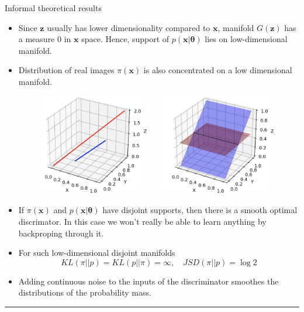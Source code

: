 \documentclass{beamer}
\newcommand{\bx}{\mathbf{x}}
\newcommand{\bz}{\mathbf{z}}
\newcommand{\btheta}{\boldsymbol{\theta}}
\begin{document}
\begin{frame}{Informal theoretical results}
	\begin{itemize}
		\footnotesize
		\item Since $\bz$ usually has lower dimensionality compared to $\bx$, manifold $G(\bz)$ has a measure 0 in $\bx$ space. Hence, support of $p(\bx | \btheta)$ lies on low-dimensional manifold.
		\item Distribution of real images $\pi(\bx)$ is also concentrated on a low dimensional manifold.
		\begin{figure}
			\centering
			\includegraphics[width=0.5\linewidth]{figs/low_dim_manifold}
		\end{figure}
		\item If $\pi(\bx)$ and $p(\bx | \btheta)$ have disjoint supports, then there is a smooth optimal discrimator. In this case we won’t really be able to learn anything by backproping through it.
		\item For such low-dimensional disjoint manifolds
		\[
			KL(\pi || p) = KL(p || \pi) = \infty, \quad JSD(\pi || p) = \log 2
		\]
		\item Adding continuous noise to the inputs of the discriminator smoothes the distributions of the probability mass.
	\end{itemize}
	\vfill
	\hrule{}
\end{frame}
\end{document}
